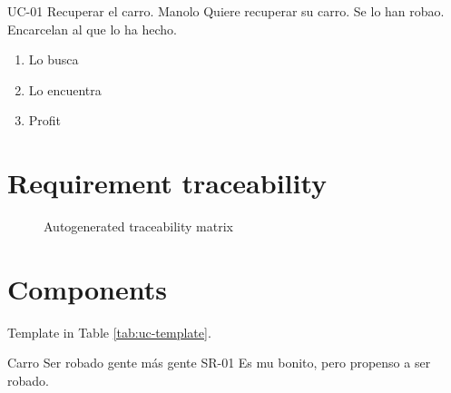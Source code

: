 \documentclass[a4paper,10pt]{article}
\begin{document}

  \begin{useCase}{UC-01}
    {Recuperar el carro.}  %
    {Manolo}  %
    {Quiere recuperar su carro.}  %
    {Se lo han robao.}  %
    {Encarcelan al que lo ha hecho.}  %
    \begin{enumerate}  %
      \item Lo busca
      \item Lo encuentra
      \item Profit
    \end{enumerate}
  \end{useCase}


  \FloatBarrier


  \section{Requirement traceability}
  \begin{figure}[h]
    \centering{}
    \caption{Autogenerated traceability matrix}
  \end{figure}



  \FloatBarrier


  \section{Components}
  Template in Table \ref{tab:uc-template}.


  \begin{component}{Carro}
    {Ser robado}  %
    {\NA}  %
    {gente}  %
    {más gente}  %
    {SR-01}  %
    Es mu bonito, pero propenso a ser robado.
  \end{component}
\end{document}
